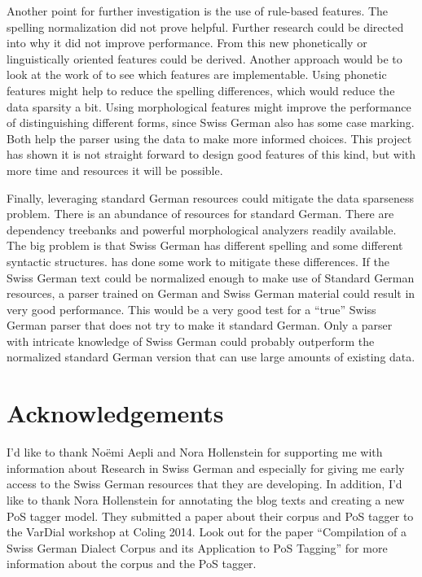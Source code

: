 \documentclass[11pt,letterpaper, covington]{article}
\begin{document}
Another point for further investigation is the use of rule-based features. The spelling normalization did not prove helpful. Further research could be directed into why it did not improve performance. From this new phonetically or linguistically oriented features could be derived. Another approach would be to look at the work of \citet{SR10} to see which features are implementable. Using phonetic features might help to reduce the spelling differences, which would reduce the data sparsity a bit. Using morphological features might improve the performance of distinguishing different forms, since Swiss German also has some case marking. Both help the parser using the data to make more informed choices. This project has shown it is not straight forward to design good features of this kind, but with more time and resources it will be possible.

Finally, leveraging standard German resources could mitigate the data sparseness problem. There is an abundance of resources for standard German. There are dependency treebanks and powerful morphological analyzers readily available. The big problem is that Swiss German has different spelling and some different syntactic structures. \citet{Scherrer11} has done some work to mitigate these differences. If the Swiss German text could be normalized enough to make use of Standard German resources, a parser trained on German and Swiss German material could result in very good performance. This would be a very good test for a ``true'' Swiss German parser that does not try to make it standard German. Only a parser with intricate knowledge of Swiss German could probably outperform the normalized standard German version that can use large amounts of existing data. 

\section{Acknowledgements}
I'd like to thank Noëmi Aepli and Nora Hollenstein for supporting me with information about Research in Swiss German and especially for giving me early access to the Swiss German resources that they are developing. In addition, I'd like to thank Nora Hollenstein for annotating the blog texts and creating a new PoS tagger model. They submitted a paper about their corpus and PoS tagger to the VarDial workshop at Coling 2014. Look out for the paper ``Compilation of a Swiss German Dialect Corpus and its Application to PoS Tagging'' for more information about the corpus and the PoS tagger.



\label{lastpage}
\end{document}
